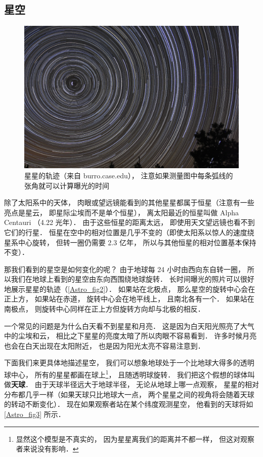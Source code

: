 \subsection{星空}

\begin{figure}[ht]
\centering
\includegraphics[width=14cm]{./figures/Astro2.png}
\caption{星星的轨迹（来自 burro.case.edu）， 注意如果测量图中每条弧线的张角就可以计算曝光的时间} \label{Astro_fig2}
\end{figure}

除了太阳系中的天体， 肉眼或望远镜能看到的其他星星都属于恒星（注意有一些亮点是星云， 即星际尘埃而不是单个恒星）， 离太阳最近的恒星叫做 Alpha Centauri （4.22 光年）． 由于这些恒星的距离太远， 即使用天文望远镜也看不到它们的行星． 恒星在空中的相对位置是几乎不变的（即使太阳系以惊人的速度绕星系中心旋转， 但转一圈仍需要 2.3 亿年， 所以与其他恒星的相对位置基本保持不变）．

那我们看到的星空是如何变化的呢？ 由于地球每 24 小时由西向东自转一圈， 所以我们在地球上看到的星空由东向西围绕地球旋转． 长时间曝光的照片可以很好地展示星星的轨迹（\autoref{Astro_fig2}）． 如果站在北极点， 那么星空的旋转中心会在正上方， 如果站在赤道， 旋转中心会在地平线上， 且南北各有一个． 如果站在南极点， 则旋转中心同样在正上方但旋转方向却与北极的相反．

一个常见的问题是为什么白天看不到星星和月亮． 这是因为白天阳光照亮了大气中的尘埃和云， 相比之下星星的亮度太暗了所以肉眼不容易看到． 许多时候月亮也会在白天出现在太阳附近， 也是因为阳光太亮不容易注意到．

下面我们来更具体地描述星空， 我们可以想象地球处于一个比地球大得多的透明球中心， 所有的星星都画在球上\footnote{显然这个模型是不真实的， 因为星星离我们的距离并不都一样， 但这对观察者来说没有影响．}， 且随透明球旋转． 我们把这个假想的球体叫做\textbf{天球}． 由于天球半径远大于地球半径， 无论从地球上哪一点观察， 星星的相对分布都几乎一样（如果天球只比地球大一点， 两个星星之间的视角将会随着天球的转动不断变化）． 现在如果观察者站在某个纬度观测星空， 他看到的天球将如\autoref{Astro_fig3} 所示．

